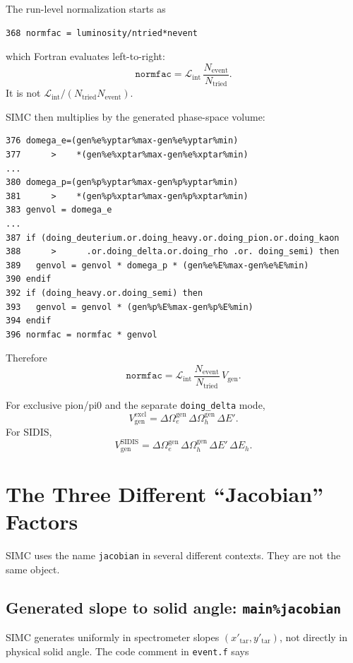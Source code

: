 \documentclass[11pt]{article}
\newcommand{\Escat}{E'}
\begin{document}
The run-level normalization starts as
\begin{lstlisting}
368 normfac = luminosity/ntried*nevent
\end{lstlisting}
which Fortran evaluates left-to-right:
\[
  \texttt{normfac}
  =
  \mathcal{L}_{\mathrm{int}}\,
  \frac{N_{\mathrm{event}}}{N_{\mathrm{tried}}}.
\]
It is not \(\mathcal{L}_{\mathrm{int}}/(N_{\mathrm{tried}}N_{\mathrm{event}})\).

SIMC then multiplies by the generated phase-space volume:
\begin{lstlisting}
376 domega_e=(gen%e%yptar%max-gen%e%yptar%min)
377      >    *(gen%e%xptar%max-gen%e%xptar%min)
...
380 domega_p=(gen%p%yptar%max-gen%p%yptar%min)
381      >    *(gen%p%xptar%max-gen%p%xptar%min)
383 genvol = domega_e
...
387 if (doing_deuterium.or.doing_heavy.or.doing_pion.or.doing_kaon
388      >      .or.doing_delta.or.doing_rho .or. doing_semi) then
389   genvol = genvol * domega_p * (gen%e%E%max-gen%e%E%min)
390 endif
392 if (doing_heavy.or.doing_semi) then
393   genvol = genvol * (gen%p%E%max-gen%p%E%min)
394 endif
396 normfac = normfac * genvol
\end{lstlisting}

Therefore
\[
  \texttt{normfac}
  =
  \mathcal{L}_{\mathrm{int}}\,
  \frac{N_{\mathrm{event}}}{N_{\mathrm{tried}}}\,
  V_{\mathrm{gen}}.
\]

For exclusive pion/pi0 and the separate \texttt{doing\_delta} mode,
\[
  V_{\mathrm{gen}}^{\mathrm{excl}}
  =
  \Delta\Omega_e^{\mathrm{gen}}\,
  \Delta\Omega_h^{\mathrm{gen}}\,
  \Delta \Escat .
\]
For SIDIS,
\[
  V_{\mathrm{gen}}^{\mathrm{SIDIS}}
  =
  \Delta\Omega_e^{\mathrm{gen}}\,
  \Delta\Omega_h^{\mathrm{gen}}\,
  \Delta \Escat\,
  \Delta E_h .
\]

\section{The Three Different ``Jacobian'' Factors}

SIMC uses the name \texttt{jacobian} in several different contexts.  They are
not the same object.

\subsection{Generated slope to solid angle: \texttt{main\%jacobian}}

SIMC generates uniformly in spectrometer slopes \((x'_{\mathrm{tar}},y'_{\mathrm{tar}})\),
not directly in physical solid angle.  The code comment in \texttt{event.f} says
\end{document}
